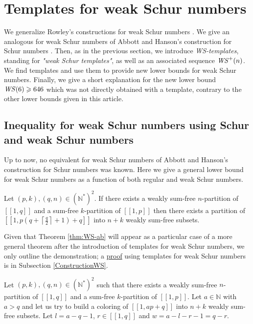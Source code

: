 \section{Templates for weak Schur numbers}
\label{WeakSchur}

We generalize Rowley's constructions for weak Schur numbers \cite{RowleyWS}. We give an analogous for weak Schur numbers of Abbott 
and Hanson's construction for Schur numbers \cite{AbbottHanson}. Then, as in the previous section, we introduce \textit{WS-templates}, 
standing for \textit{"weak Schur templates"}, as well as an associated sequence \(\mathit{WS}^+(n)\). We find templates and use them to provide 
new lower bounds for weak Schur numbers. Finally, we give a short explanation for the new lower bound \(\mathit{WS}(6) \geqslant 646\) which 
was not directly obtained with a template, contrary to the other lower bounds given in this article.

\subsection{Inequality for weak Schur numbers using Schur and weak Schur numbers}

Up to now, no equivalent for weak Schur numbers of Abbott and Hanson's construction for Schur numbers
\cite{AbbottHanson} was known. Here we give a general lower bound for weak Schur numbers as a function of both
regular and weak Schur numbers.

\begin{theorem}
\label{thm:WS-ab}
\begin{sloppypar}
Let \((p,k), (q,n) \in (\mathbb{N}^*)^2\). If there exists a weakly sum-free \(n\)-partition of \([\![1,q]\!]\)
and a sum-free \(k\)-partition of \([\![1,p]\!]\) then there exists a partition of
\({[\![1,p(q+\left \lceil \frac{q}{2} \right \rceil + 1)+q]\!]}\) into \(n+k\) weakly sum-free subsets.
\end{sloppypar}
\end{theorem}

Given that Theorem \ref{thm:WS-ab} will appear as a particular case of a more general theorem after the introduction of
templates for weak Schur numbers, we only outline the demonstration; a \hyperref[PreuveThm]{proof} using templates 
for weak Schur numbers is in Subsection \ref{ConstructionWS}.

Let \((p, k), (q, n) \in (\mathbb{N}^*)^2\) such that there exists a weakly sum-free \(n\)-partition of \([\![1,q]\!]\) 
and a sum-free \(k\)-partition of \([\![1,p]\!]\). Let \(a \in \mathbb{N}\) with \(a > q\)
and let us try to build a coloring of \([\![1, ap + q]\!]\) into \(n + k\) weakly sum-free subsets. Let
\(l = a - q - 1\), \(r \in [\![1,q]\!]\) and \(w = a - l - r - 1 = q - r\).

